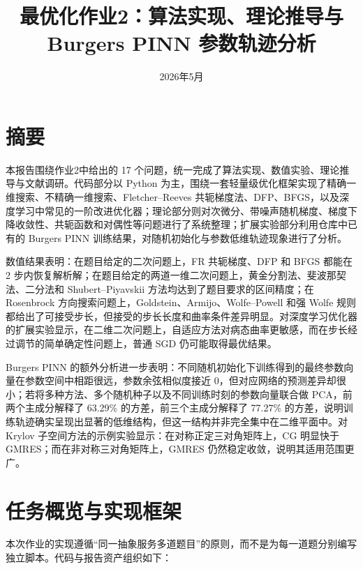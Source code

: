 \documentclass[UTF8,a4paper,12pt,fontset=none]{ctexart}
\title{最优化作业2：算法实现、理论推导与 Burgers PINN 参数轨迹分析}
\author{}
\date{2026年5月}
\begin{document}
\maketitle
\tableofcontents
\newpage

\section{摘要}

本报告围绕作业2中给出的 17 个问题，统一完成了算法实现、数值实验、理论推导与文献调研。代码部分以 Python 为主，围绕一套轻量级优化框架实现了精确一维搜索、不精确一维搜索、Fletcher--Reeves 共轭梯度法、DFP、BFGS，以及深度学习中常见的一阶改进优化器；理论部分则对次微分、带噪声随机梯度、梯度下降收敛性、共轭函数和对偶性等问题进行了系统整理；扩展实验部分利用仓库中已有的 Burgers PINN 训练结果，对随机初始化与参数低维轨迹现象进行了分析。

数值结果表明：在题目给定的二次问题上，FR 共轭梯度、DFP 和 BFGS 都能在 2 步内恢复解析解；在题目给定的两道一维二次问题上，黄金分割法、斐波那契法、二分法和 Shubert--Piyavskii 方法均达到了题目要求的区间精度；在 Rosenbrock 方向搜索问题上，Goldstein、Armijo、Wolfe--Powell 和强 Wolfe 规则都给出了可接受步长，但接受的步长长度和曲率条件差异明显。对深度学习优化器的扩展实验显示，在二维二次问题上，自适应方法对病态曲率更敏感，而在步长经过调节的简单确定性问题上，普通 SGD 仍可能取得最优结果。

Burgers PINN 的额外分析进一步表明：不同随机初始化下训练得到的最终参数向量在参数空间中相距很远，参数余弦相似度接近 0，但对应网络的预测差异却很小；若将多种方法、多个随机种子以及不同训练时刻的参数向量联合做 PCA，前两个主成分解释了 63.29\% 的方差，前三个主成分解释了 77.27\% 的方差，说明训练轨迹确实呈现出显著的低维结构，但这一结构并非完全集中在二维平面中。对 Krylov 子空间方法的示例实验显示：在对称正定三对角矩阵上，CG 明显快于 GMRES；而在非对称三对角矩阵上，GMRES 仍然稳定收敛，说明其适用范围更广。

\section{任务概览与实现框架}

本次作业的实现遵循“同一抽象服务多道题目”的原则，而不是为每一道题分别编写独立脚本。代码与报告资产组织如下：
\end{document}
